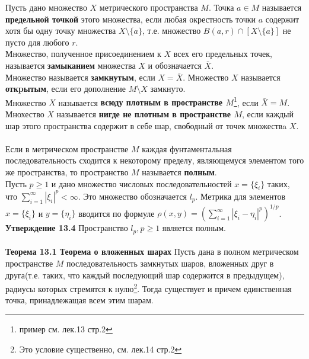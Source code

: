 \documentclass{article}
\begin{document}
	Пусть дано множество $X$ метрического пространства $M$. Точка $a\in M$ называется \textbf{предельной точкой} этого множества, если любая окрестность точки $a$ содержит хотя бы одну точку множества $X\setminus \{a\}$, т.е. множество $B(a,r)\cap[X\setminus \{a\}]$ не пусто для любого $r$.\\
	Множество, полученное присоединением к $X$ всех его предельных точек, называется \textbf{замыканием} множества $X$ и обозначается $\overline{X}$.\\
	Множество называется \textbf{замкнутым}, если $X=\bar{X}$. Множество $X$ называется \textbf{откpытым}, если его дополнение $M\setminus X$ замкнуто. \\
	Множество $X$ называется \textbf{всюду плотным в пространстве $M$}\footnote{пример см. лек.13 стр.2},  если $\bar{X}=M$. Мнохество $X$ называется \textbf{нигде не плотным в пространстве $M$}, если каждый шар этого пространства содержит в себе шар, свободный от точек множествa $X$.\\
	\\
	Если в метрическом пространстве $M$ каждая фунтаментальная последовательность сходится к некоторому пределу, являющемуся элементом того же пространства, то пространство $M$ называется \textbf{полным}.\\
	Пусть $p\ge 1$ и дано множество числовых последовательностей $x=\{{\xi}_{i}\}$ таких, что $\sum_{i=1}^{\infty} {|{\xi}_{i}|}^{p} < \infty$. Это множество обозначается ${l}_{p}$. Метрика для элементов $x=\{{\xi}_{i}\}$ и $y=\{{\eta}_{i}\}$ вводится по формуле $\rho(x,y)={(\sum_{i=1}^{\infty} {|{\xi}_{i}-{\eta}_{i}|}^{p})}^{1/p}$.\\
	\textbf{Утверждение 13.4} Пространство ${l}_{p}, p\ge 1$ является полным.\\
	\\
	\textbf{Теорема 13.1 Теорема о вложенных шарах} Пусть дана в полном метрическом пространстве $M$ последовательность замкнутых шаров, вложенных друг в друга(т.е. таких, что каждый последующий шар содержится в предыдущем), радиусы которых стремятся к нулю\footnote{Это условие существенно, см. лек.14 стр.2}. Тогда существует и причем единственная точка, принадлежащая всем этим шарам.\\
\end{document}

